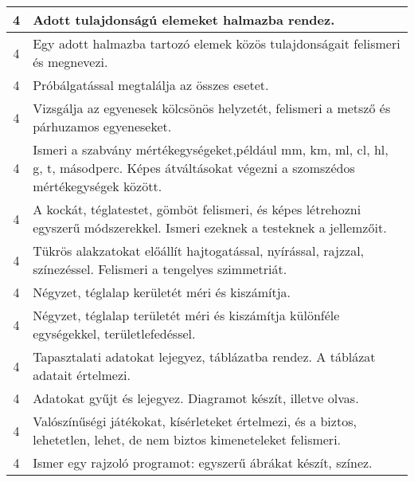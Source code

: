 \begin{longtable}{c | p{12cm} }
                                
                                          4 &  Adott tulajdonságú elemeket halmazba rendez. \\ \hline
                                          4 &  Egy adott halmazba tartozó elemek közös tulajdonságait felismeri és megnevezi. \\ \hline
                                          4 &  Próbálgatással megtalálja az összes esetet. \\ \hline
                                          4 &  Vizsgálja az egyenesek kölcsönös helyzetét, felismeri a metsző és párhuzamos egyeneseket. \\ \hline
                                          4 &  Ismeri a szabvány mértékegységeket,például mm, km, ml, cl, hl, g, t, másodperc. Képes átváltásokat végezni a szomszédos mértékegységek között. \\ \hline
                                          4 &  A kockát, téglatestet, gömböt felismeri, és képes létrehozni egyszerű módszerekkel. Ismeri ezeknek a testeknek a jellemzőit. \\ \hline
                                          4 &  Tükrös alakzatokat  előállít hajtogatással, nyírással, rajzzal, színezéssel. Felismeri a tengelyes szimmetriát. \\ \hline
                                          4 &  Négyzet, téglalap kerületét méri és kiszámítja. \\ \hline
                                          4 &  Négyzet, téglalap területét méri és kiszámítja különféle egységekkel, területlefedéssel. \\ \hline
                                          4 &  Tapasztalati adatokat lejegyez, táblázatba rendez. A táblázat adatait értelmezi. \\ \hline
                                          4 &  Adatokat gyűjt és lejegyez. Diagramot készít, illetve olvas. \\ \hline
                                          4 &  Valószínűségi játékokat, kísérleteket értelmezi, és a biztos, lehetetlen, lehet, de nem biztos kimeneteleket felismeri. \\ \hline
                                          4 &  Ismer egy rajzoló programot: egyszerű ábrákat készít, színez.
 \\ \hline
                                      
                        \end{longtable}
            \clearpage

